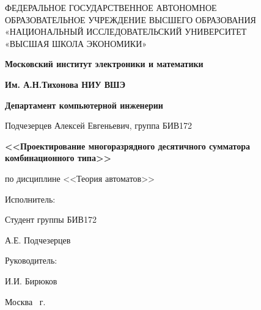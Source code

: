 \begin{titlepage}
	\begin{center}
		ФЕДЕРАЛЬНОЕ  ГОСУДАРСТВЕННОЕ АВТОНОМНОЕ \\
		ОБРАЗОВАТЕЛЬНОЕ УЧРЕЖДЕНИЕ ВЫСШЕГО ОБРАЗОВАНИЯ\\
		«НАЦИОНАЛЬНЫЙ ИССЛЕДОВАТЕЛЬСКИЙ УНИВЕРСИТЕТ\\
		«ВЫСШАЯ ШКОЛА ЭКОНОМИКИ»
	\end{center}
	
	\begin{center}
		\textbf{Московский институт электроники и математики}
		
		\textbf{Им. А.Н.Тихонова НИУ ВШЭ}
		
		\vspace{2ex}
		
		\textbf{Департамент компьютерной инженерии}
	\end{center}
	\vspace{1ex}	
	\begin{center}
		Подчезерцев Алексей Евгеньевич, группа БИВ172
		
	\end{center}	
	\vspace{1ex}
	\begin{center}
		\textbf{<<Проектирование многоразрядного десятичного сумматора
			комбинационного типа>>}
	\end{center}	
	\vspace{2ex}
	\begin{center}
		по дисциплине <<Теория автоматов>>

	\end{center}
	\vspace{2ex}
	\begin{flushright}
		Исполнитель:
		
		Студент группы БИВ172
		
	    А.Е. Подчезерцев 
		
	\end{flushright}
	\vspace{3ex}
	\begin{flushright}
		Руководитель:
		
		И.И. Бирюков
	\end{flushright}
	\vfill
	\begin{center}
		Москва \the\year \, г.
	\end{center}
\end{titlepage}